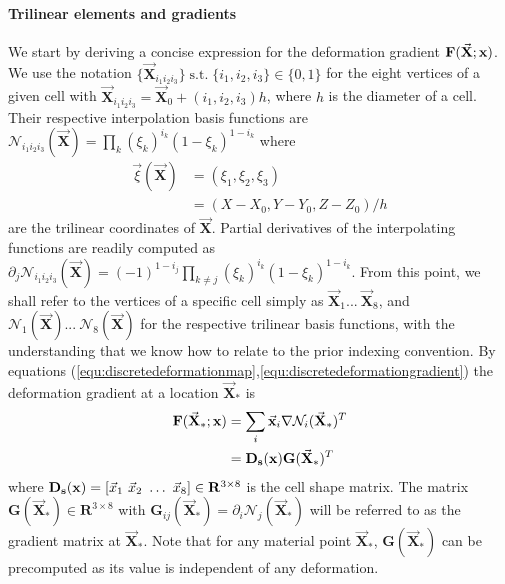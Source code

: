 \paragraph{Trilinear elements and gradients} We start by deriving a
concise expression for the deformation gradient
$\mathbf{F}(\vec{\mathbf X};\hbox{\boldmath $\mathbf x$})$. We use the notation
$\{\vec{\mathbf X}_{i_1i_2i_3}\}\;\text{s.t.}\;\{i_1,i_2,i_3\}\in\{0,1\}$ for the eight
vertices of a given cell with
$\vec{\mathbf X}_{i_1i_2i_3}=\vec{\mathbf X}_0+(i_1,i_2,i_3)h$,
where $h$ is the diameter of a cell. Their
respective interpolation basis functions are
$\mathcal{N}_{i_1i_2i_3}(\vec{\mathbf X})=\prod_k(\xi_k)^{i_k}(1-\xi_k)^{1-i_k}$
where
\begin{equation*}
  \begin{aligned}
\vec{\xi}(\vec{\mathbf
  X})&=(\xi_1,\xi_2,\xi_3)\\
&=(X-X_0,Y-Y_0,Z-Z_0)/h
\end{aligned}
\end{equation*}
are the trilinear coordinates of $\vec{\mathbf X}$. Partial derivatives of the
interpolating functions are readily computed as
$\partial_j\mathcal{N}_{i_1i_2i_3}(\vec{\mathbf X})=(-1)^{1-i_j}\prod_{k\ne
  j}(\xi_k)^{i_k}(1-\xi_k)^{1-i_k}$.
From this point, we shall refer to the vertices of a specific cell
simply as $\vec{\mathbf X}_1...\ \vec{\mathbf X}_8$, and
$\mathcal{N}_1(\vec{\mathbf X})...\ \mathcal{N}_8(\vec{\mathbf X})$ for the
respective trilinear basis functions, with the understanding that we
know how to relate to the prior indexing convention.  By equations
(\ref{equ:discretedeformationmap},\ref{equ:discretedeformationgradient}) the
deformation gradient at a location $\vec{\mathbf X}_\ast$ is
\begin{equation}
  \label{equ:discretef}
  \begin{aligned}
    \mathbf F(\vec{\mathbf X}_\ast;\mathbf x) &=
    \sum_i\vec{\mathbf x}_i\nabla\mathcal{N}_i(\vec{\mathbf
      X}_\ast)^T\\
    &=\mathbf{D_s}(\hbox{\boldmath $\mathbf x$})\mathbf{G}(\vec{\mathbf X}_\ast)^T\\
  \end{aligned}
\end{equation}
where
$\mathbf{D_s}(\bvec{\mathbf x})=\left[\vec{x}_1\ \vec{x}_2\ \hdots\
  \vec{x}_8\right]\in\mathbf{R}^{3\times 8}$
is the cell shape matrix. The matrix
$\mathbf{G}(\vec{\mathbf X}_\ast)\in\mathbf{R}^{3\times 8}$ with
$\mathbf G_{ij}(\vec{\mathbf X}_\ast)=\partial_i\mathcal{N}_j(\vec{\mathbf X}_\ast)$ will be
referred to as the gradient matrix at $\vec{\mathbf X}_\ast$. Note that for
any material point $\vec{\mathbf X}_\ast$, $\mathbf{G}(\vec{\mathbf X}_\ast)$ can be
precomputed as its value is independent of any deformation.
\vspace*{-.1in}
